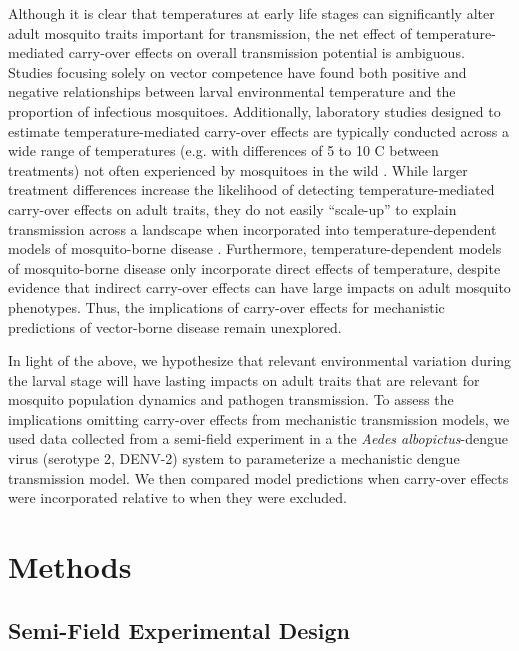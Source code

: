 \documentclass[12pt]{article}
\begin{document}

Although it is clear that temperatures at early life stages can significantly alter adult mosquito traits important for transmission, the net effect of temperature-mediated carry-over effects on overall transmission potential is ambiguous. Studies focusing solely on vector competence have found both positive \citep{muturi2011c} and negative \citep{muturi2011a} relationships between larval environmental temperature and the proportion of infectious mosquitoes. Additionally, laboratory studies designed to estimate temperature-mediated carry-over effects are typically conducted across a wide range of temperatures (e.g. with differences of 5 to 10 \degree C between treatments) not often experienced by mosquitoes in the wild \citep{cator2013}. While larger treatment differences increase the likelihood of detecting temperature-mediated carry-over effects on adult traits, they do not easily ``scale-up'' to explain transmission across a landscape when incorporated into temperature-dependent models of mosquito-borne disease \citep{pascual2006, mordecai2017, reiner2013}. Furthermore, temperature-dependent models of mosquito-borne disease only incorporate direct effects of temperature, despite evidence that indirect carry-over effects can have large impacts on adult mosquito phenotypes. Thus, the implications of carry-over effects for mechanistic predictions of vector-borne disease remain unexplored.


In light of the above, we hypothesize that relevant environmental variation during the larval stage will have lasting impacts on adult traits that are relevant for mosquito population dynamics and pathogen transmission. To assess the implications omitting carry-over effects from mechanistic transmission models, we used data collected from a semi-field experiment in a the \textit{Aedes albopictus}-dengue virus (serotype 2, DENV-2) system to parameterize a mechanistic dengue transmission model. We then compared model predictions when carry-over effects were incorporated relative to when they were excluded.


\section{Methods}
\subsection{Semi-Field Experimental Design}
\end{document}
